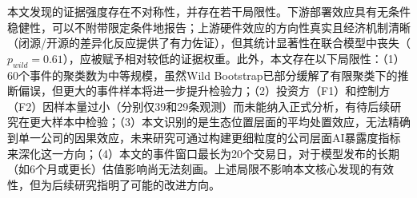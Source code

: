 \documentclass[11pt,fontset=fandol,a4paper]{ctexart}
\begin{document}
本文发现的证据强度存在不对称性，并存在若干局限性。下游部署效应具有无条件稳健性，可以不附带限定条件地报告；上游硬件效应的方向性真实且经济机制清晰（闭源/开源的差异化反应提供了有力佐证），但其统计显著性在联合模型中丧失（$p_{wild}=0.61$），应被赋予相对较低的证据权重。此外，本文存在以下局限性：（1）60个事件的聚类数为中等规模，虽然Wild Bootstrap已部分缓解了有限聚类下的推断偏误，但更大的事件样本将进一步提升检验力；（2）投资方（F1）和控制方（F2）因样本量过小（分别仅39和29条观测）而未能纳入正式分析，有待后续研究在更大样本中检验；（3）本文识别的是生态位置层面的平均处置效应，无法精确到单一公司的因果效应，未来研究可通过构建更细粒度的公司层面AI暴露度指标来深化这一方向；（4）本文的事件窗口最长为20个交易日，对于模型发布的长期（如6个月或更长）估值影响尚无法刻画。上述局限不影响本文核心发现的有效性，但为后续研究指明了可能的改进方向。


\end{document}
